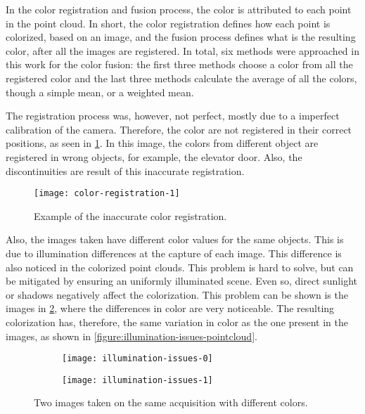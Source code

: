 In the color registration and fusion process, the color is attributed to each point in the point cloud. In short, the color registration defines how each point is colorized, based on an image, and the fusion process defines what is the resulting color, after all the images are registered. In total, six methods were approached in this work for the color fusion: the first three methods choose a color from all the registered color and the last three methods calculate the average of all the colors, though a simple mean, or a weighted mean.

The registration process was, however, not perfect, mostly due to a imperfect calibration of the camera. Therefore, the color are not registered in their correct positions, as seen in \cref{figure:wrong-registration-photocopy}. In this image, the colors from different object are registered in wrong objects, for example, the elevator door. Also, the discontinuities are result of this inaccurate registration.

\begin{figure}[h]
    
    \centering
    \texttt{[image: color-registration-1]}

    \caption{Example of the inaccurate color registration.}
    \label{figure:wrong-registration-photocopy}
\end{figure}

Also, the images taken have different color values for the same objects. This is due to illumination differences at the capture of each image. This difference is also noticed in the colorized point clouds. This problem is hard to solve, but can be mitigated by ensuring an uniformly illuminated scene. Even so, direct sunlight or shadows negatively affect the colorization. This problem can be shown is the images in \cref{figure:illumination-issues-images}, where the differences in color are very noticeable. The resulting colorization has, therefore, the same variation in color as the one present in the images, as shown in \cref{figure:illumination-issues-pointcloud}.

\begin{figure}[h]
    
    \centering
    \begin{subfigure}{0.5\textwidth}
        \centering
        \texttt{[image: illumination-issues-0]}
    \end{subfigure}%
    \begin{subfigure}{0.5\textwidth}
        \centering
        \texttt{[image: illumination-issues-1]}
    \end{subfigure}%

    \caption{Two images taken on the same acquisition with different colors.}
    \label{figure:illumination-issues-images}

\end{figure}

